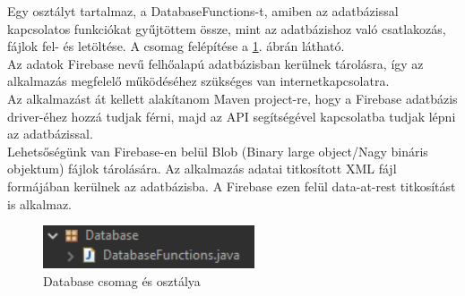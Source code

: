 Egy osztályt tartalmaz, a DatabaseFunctions-t, amiben az adatbázissal kapcsolatos funkciókat gyűjtöttem össze, mint az adatbázishoz való csatlakozás, fájlok fel- és letöltése. A csomag felépítése a \ref{fig:package_database}. ábrán látható.
\vspace{5pt}\\Az adatok Firebase nevű felhőalapú adatbázisban kerülnek tárolásra, így az alkalmazás megfelelő működéséhez szükséges van internetkapcsolatra.
\\Az alkalmazást át kellett alakítanom Maven project-re, hogy a Firebase adatbázis driver-éhez hozzá tudjak férni, majd az API segítségével kapcsolatba tudjak lépni az adatbázissal.
\\Lehetsőségünk van Firebase-en belül Blob (Binary large object/Nagy bináris objektum) fájlok tárolására. Az alkalmazás adatai titkosított XML fájl formájában kerülnek az adatbázisba. A Firebase ezen felül data-at-rest titkosítást is alkalmaz.
\begin{figure}[h]
	\centering
	\includegraphics[scale=0.7]{images/package_database.png}
	\caption{Database csomag és osztálya}
	\label{fig:package_database}
\end{figure}



